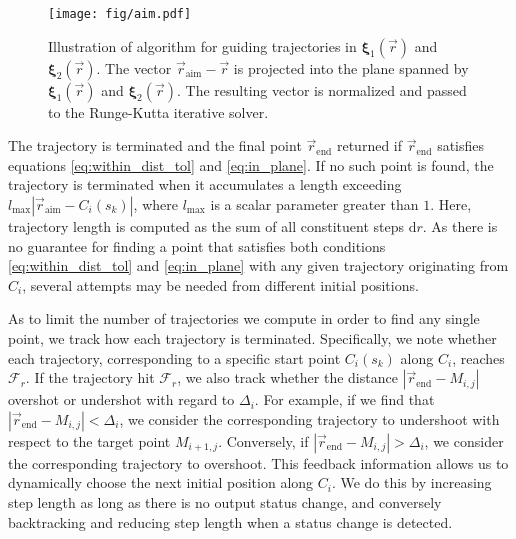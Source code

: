 \begin{figure}[h!] 
\centering
\texttt{[image: fig/aim.pdf]}
\caption{Illustration of algorithm for guiding trajectories in $\bm{\xi}_1(\vec{r})$ and $\bm{\xi}_2(\vec{r})$. The vector $\vec{r}_{\text{aim}}-\vec{r}$ is projected into the plane spanned by $\bm{\xi}_1(\vec{r})$ and $\bm{\xi}_2(\vec{r})$. The resulting vector is normalized and passed to the Runge-Kutta iterative solver.}\label{fig:aim}
\end{figure}




The trajectory is terminated and the final point $\vec{r}_{\text{end}}$ returned if $\vec{r}_{\text{end}}$ satisfies equations \eqref{eq:within_dist_tol} and \eqref{eq:in_plane}. If no such point is found, the trajectory is terminated when it accumulates a length exceeding $l_{\text{max}}\left| \vec{r}_{\text{aim}} - C_i(s_k) \right|$, where $l_{\text{max}}$ is a scalar parameter greater than $1$. Here, trajectory length is computed as the sum of all constituent steps $\text{d}r$. As there is no guarantee for finding a point that satisfies both conditions \eqref{eq:within_dist_tol} and \eqref{eq:in_plane} with any given trajectory originating from $C_i$, several attempts may be needed from different initial positions.

As to limit the number of trajectories we compute in order to find any single point, we track how each trajectory is terminated. Specifically, we note whether each trajectory, corresponding to a specific start point $C_i(s_k)$ along $C_i$, reaches $\mathcal{F}_r$. If the trajectory hit $\mathcal{F}_r$, we also track whether the distance $\left|\vec{r}_{\text{end}}-M_{i,j}\right|$ overshot or undershot with regard to $\Delta_i$. For example, if we find that $\left|\vec{r}_{\text{end}}-M_{i,j}\right| < \Delta_i$, we consider the corresponding trajectory to undershoot with respect to the target point $M_{i+1,j}$. Conversely, if $\left|\vec{r}_{\text{end}}-M_{i,j}\right| > \Delta_i$, we consider the corresponding trajectory to overshoot. This feedback information allows us to dynamically choose the next initial position along $C_i$. We do this by increasing step length as long as there is no output status change, and conversely backtracking and reducing step length when a status change is detected. 

